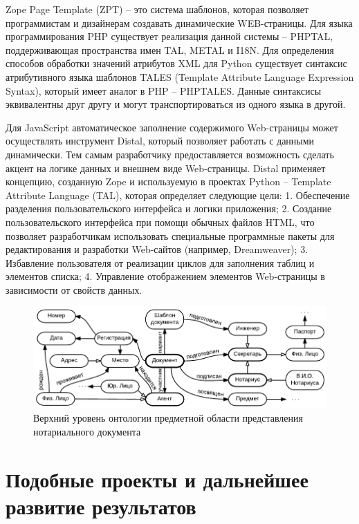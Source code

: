 \documentclass[utf8]{../IncArticle}
\begin{document}
Zope Page Template (ZPT) – это система шаблонов, которая позволяет программистам и дизайнерам создавать динамические WEB-страницы. Для языка программирования PHP существует реализация данной системы – PHPTAL, поддерживающая пространства имен TAL, METAL и I18N.
Для определения способов обработки значений атрибутов XML для Python существует синтаксис атрибутивного языка шаблонов TALES (Template Attribute Language Expression Syntax), который имеет аналог в PHP – PHPTALES. Данные синтаксисы эквивалентны друг другу и могут транспортироваться из одного языка в другой.

Для JavaScript автоматическое заполнение содержимого Web-страницы может осуществлять инструмент Distal, который позволяет работать с данными динамически. Тем самым разработчику предоставляется возможность сделать акцент на логике данных и внешнем виде Web-страницы.
Distal применяет концепцию, созданную Zope и используемую в проектах Python – Template Attribute Language (TAL), которая определяет следующие цели:
1.	Обеспечение разделения пользовательского интерфейса и логики приложения;
2.	Создание пользовательского интерфейса при помощи обычных файлов HTML, что позволяет разработчикам использовать специальные программные пакеты для редактирования и разработки Web-сайтов (например, Dreamweaver);
3.	Избавление пользователя от реализации циклов для заполнения таблиц и элементов списка;
4.	Управление отображением элементов Web-страницы в зависимости от свойств данных.


\begin{figure}[!t]
\centering
\includegraphics[width=0.8\linewidth]{DocumentOntology-ru.pdf}
\caption{Верхний уровень онтологии предметной области представления
  нотариального документа}
\label{notaryontology}
\end{figure}

\section{Подобные проекты и дальнейшее развитие результатов}
\end{document}
